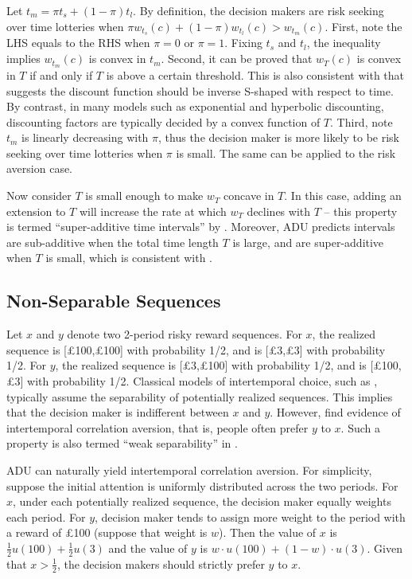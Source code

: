 \documentclass[
  12pt,
]{article}
\begin{document}
Let \(t_m = \pi t_s +(1-\pi) t_l\). By definition, the decision makers
are risk seeking over time lotteries when
\(\pi w_{t_s}(c)+(1-\pi)w_{t_l}(c)>w_{t_m}(c)\). First, note the LHS
equals to the RHS when \(\pi=0\) or \(\pi=1\). Fixing \(t_s\) and
\(t_l\), the inequality implies \(w_{t_m}(c)\) is convex in \(t_m\).
Second, it can be proved that \(w_T(c)\) is convex in \(T\) if and only
if \(T\) is above a certain threshold. This is also consistent with
\citet{takeuchi_non-parametric_2011} that suggests the discount function
should be inverse S-shaped with respect to time. By contrast, in many
models such as exponential and hyperbolic discounting, discounting
factors are typically decided by a convex function of \(T\). Third, note
\(t_m\) is linearly decreasing with \(\pi\), thus the decision maker is
more likely to be risk seeking over time lotteries when \(\pi\) is
small. The same can be applied to the risk aversion case.

Now consider \(T\) is small enough to make \(w_T\) concave in \(T\). In
this case, adding an extension to \(T\) will increase the rate at which
\(w_T\) declines with \(T\) -- this property is termed ``super-additive
time intervals'' by \citet{read_is_2001}. Moreover, ADU predicts
intervals are sub-additive when the total time length \(T\) is large,
and are super-additive when \(T\) is small, which is consistent with
\citet{scholten_discounting_2006}.

\hypertarget{non-separable-sequences}{%
\subsection{Non-Separable Sequences}\label{non-separable-sequences}}

Let \(x\) and \(y\) denote two 2-period risky reward sequences. For
\(x\), the realized sequence is {[}£100,£100{]} with probability 1/2,
and is {[}£3,£3{]} with probability 1/2. For \(y\), the realized
sequence is {[}£3,£100{]} with probability 1/2, and is {[}£100,£3{]}
with probability 1/2. Classical models of intertemporal choice, such as
\citet{fishburn_time_1982}, typically assume the separability of
potentially realized sequences. This implies that the decision maker is
indifferent between \(x\) and \(y\). However,
\citet{andersen_multiattribute_2018} find evidence of intertemporal
correlation aversion, that is, people often prefer \(y\) to \(x\). Such
a property is also termed ``weak separability'' in
\citet{noor_constrained_2023}.

ADU can naturally yield intertemporal correlation aversion. For
simplicity, suppose the initial attention is uniformly distributed
across the two periods. For \(x\), under each potentially realized
sequence, the decision maker equally weights each period. For \(y\),
decision maker tends to assign more weight to the period with a reward
of £100 (suppose that weight is \(w\)). Then the value of \(x\) is
\(\frac{1}{2} u(100) + \frac{1}{2} u(3)\) and the value of \(y\) is
\(w\cdot u(100) +(1-w) \cdot u(3)\). Given that \(x>\frac{1}{2}\), the
decision makers should strictly prefer \(y\) to \(x\).
\end{document}
